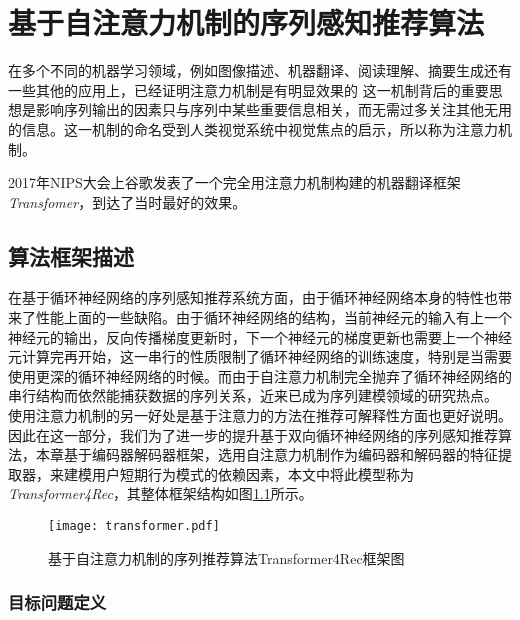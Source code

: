 ﻿%
\chapter{基于自注意力机制的序列感知推荐算法}

在多个不同的机器学习领域，例如图像描述、机器翻译、阅读理解、摘要生成还有一些其他的应用上，已经证明注意力机制是有明显效果的%
这一机制背后的重要思想是影响序列输出的因素只与序列中某些重要信息相关，而无需过多关注其他无用的信息。这一机制的命名受到人类视觉系统中视觉焦点的启示，所以称为注意力机制。

2017年NIPS大会上谷歌发表了一个完全用注意力机制构建的机器翻译框架\textit{Transfomer}，到达了当时最好的效果。
\section{算法框架描述}

在基于循环神经网络的序列感知推荐系统方面，由于循环神经网络本身的特性也带来了性能上面的一些缺陷。由于循环神经网络的结构，当前神经元的输入有上一个神经元的输出，反向传播梯度更新时，下一个神经元的梯度更新也需要上一个神经元计算完再开始，这一串行的性质限制了循环神经网络的训练速度，特别是当需要使用更深的循环神经网络的时候。而由于自注意力机制完全抛弃了循环神经网络的串行结构而依然能捕获数据的序列关系，近来已成为序列建模领域的研究热点。
使用注意力机制的另一好处是基于注意力的方法在推荐可解释性方面也更好说明。%
因此在这一部分，我们为了进一步的提升基于双向循环神经网络的序列感知推荐算法，本章基于编码器解码器框架，选用自注意力机制作为编码器和解码器的特征提取器，来建模用户短期行为模式的依赖因素，本文中将此模型称为\textit{Transformer4Rec}，其整体框架结构如图\ref{fig:transformer}所示。
\begin{figure}[htb]
  \centering
  \texttt{[image: transformer.pdf]}\\
  \caption{基于自注意力机制的序列推荐算法Transformer4Rec框架图}
  \label{fig:transformer}
\end{figure}
\subsection{目标问题定义}

